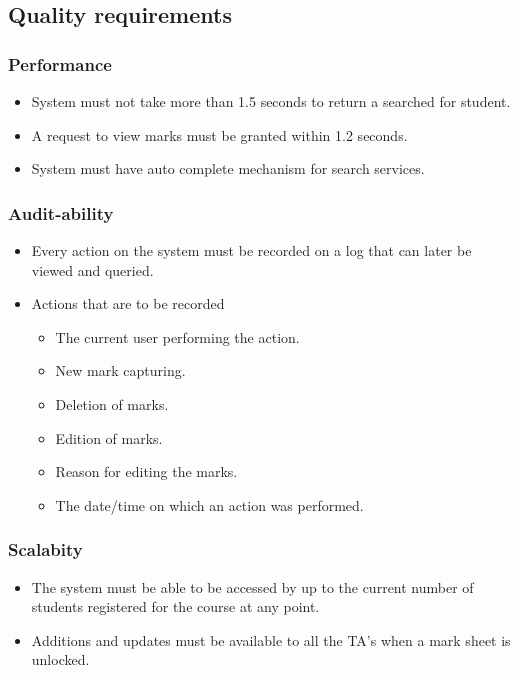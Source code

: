 \documentclass[11pt,a4paper]{article}
\begin{document}
\subsection{Quality requirements}
\subsubsection{Performance}
	\begin{itemize}
	\item System must not take more than 1.5 seconds to return a searched for student.
	\item A request to view marks must be granted within 1.2 seconds.
	\item System must have auto complete mechanism for search services.
	\end{itemize}

	\subsubsection{Audit-ability}
	\begin{itemize}
	\item Every action on the system must be recorded on a log that can later be viewed and queried.
	\item Actions that are to be recorded
	\begin{itemize}
	\item The current user performing the action.
	\item New mark capturing.
	\item Deletion of marks.
	\item Edition of marks.
	\item Reason for editing the marks.
	\item The date/time on which an action was performed.
	\end{itemize}
	\end{itemize}

\subsubsection{Scalabity}
	\begin{itemize}
	\item The system must be able to be accessed by up to the current number of students registered for the course at any point.
	\item Additions and updates must be available to all the TA's when a mark sheet is unlocked.
	\end{itemize}	
\end{document}
